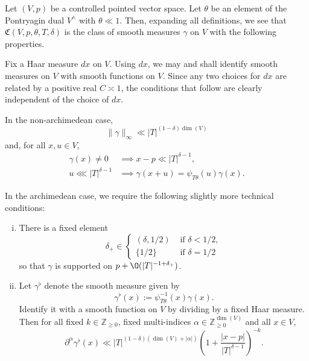 \begin{example}\label{example:standard2:let-v-p}
  Let $(V,p)$ be a controlled pointed vector space.  Let $\theta$ be an element of the Pontryagin dual $V^\wedge$ with $\theta \ll 1$.  Then, expanding all definitions, we see that $\mathfrak{C}(V, p, \theta, T, \delta)$ is the class of smooth measures $\gamma$ on $V$ with the following properties.

  Fix a Haar measure $d x$ on $V$.  Using $d x$, we may and shall identify smooth measures on $V$ with smooth functions on $V$.  Since any two choices for $d x$ are related by a positive real $C \asymp 1$, the conditions that follow are clearly independent of the choice of $d x$.

  In the non-archimedean case,
  \begin{equation*}
    \|\gamma\|_{\infty} \ll |T|^{(1 - \delta) \dim(V)}
  \end{equation*}
  and, for all $x,u \in V$,
  \begin{align*}
    \gamma(x) \neq 0 &\implies x - p \ll  |T|^{\delta-1}, \\
    u \lll |T|^{\delta-1} &\implies \gamma(x+u) = \psi_{T \theta}(u) \gamma(x).
  \end{align*}

  In the archimedean case, we require the following slightly more technical conditions:
  \begin{enumerate}[(i)]
  \item \label{item:class-CGthetaTdelta:1} There is a fixed element
    \begin{equation*}
      \delta_+ \in \begin{cases}
        (\delta,1/2) & \text{ if } \delta < 1/2, \\
        \{1/2\} & \text{ if } \delta = 1/2
      \end{cases}
    \end{equation*}
    so that $\gamma$ is supported on $p + \O(|T|^{-1 + \delta_+})$.
  \item \label{item:class-CGthetaTdelta:2} Let $\gamma^{\flat}$ denote the smooth measure given by
    \begin{equation}\label{eq:gammaflatx-:=-psi_t}
      \gamma^{\flat}(x) := \psi_{T \theta}^{-1}(x) \gamma(x).
    \end{equation}
    Identify it with a smooth function on $V$ by dividing by a fixed Haar measure.  Then for all fixed $k \in \mathbb{Z}_{\geq 0}$, fixed multi-indices $\alpha \in \mathbb{Z}_{\geq 0}^{\dim(V)}$ and all $x \in V$,
    \begin{equation}\label{eq:y_1-dotsb-y_m-2}
      \partial^\alpha  \gamma^{\flat}(x)
      \ll |T|^{(1 - \delta) (\dim(V) + |\alpha|)} \left( 1 + \frac{|x-p|}{|T|^{\delta -1}} \right)^{-k}.
    \end{equation}
  \end{enumerate}
\end{example}


